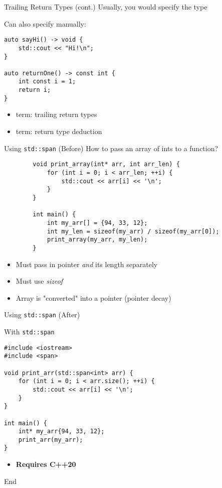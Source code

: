 \documentclass[t]{beamer}
\begin{document}
\begin{frame}[fragile]{Trailing Return Types (cont.)}
	Usually, you would specify the type

		{\large Can also specify manually:}
	\begin{verbatim}
auto sayHi() -> void {
	std::cout << "Hi!\n";
}

auto returnOne() -> const int {
	int const i = 1;
	return i;
}
	\end{verbatim}

	\begin{itemize}
		\item term: trailing return types
		\item term: return type deduction
	\end{itemize}
\end{frame}


\begin{frame}[fragile]{Using \texttt{std::span} (Before)}
	How to pass an array of ints to a function?
	\pause

	\begin{verbatim}
		void print_array(int* arr, int arr_len) {
			for (int i = 0; i < arr_len; ++i) {
				std::cout << arr[i] << '\n';
			}
		}

		int main() {
			int my_arr[] = {94, 33, 12};
			int my_len = sizeof(my_arr) / sizeof(my_arr[0]);
			print_array(my_arr, my_len);
		}
	\end{verbatim}

	\begin{itemize}
		\item Must pass in pointer \textit{and} its length separately
		\item Must use \textit{sizeof}
		\item Array is "converted" into a pointer (pointer decay)
	\end{itemize}


\end{frame}


\begin{frame}[fragile]{Using \texttt{std::span} (After)}

	{\large With \texttt{std::span}}
	\begin{verbatim}
#include <iostream>
#include <span>

void print_arr(std::span<int> arr) {
	for (int i = 0; i < arr.size(); ++i) {
		std::cout << arr[i] << '\n';
	}
}

int main() {
	int* my_arr{94, 33, 12};
	print_arr(my_arr);
}
\end{verbatim}

	\begin{itemize}
		\item \textbf{Requires C++20}
	\end{itemize}
\end{frame}


\begin{frame}{End}

\end{frame}
\end{document}
